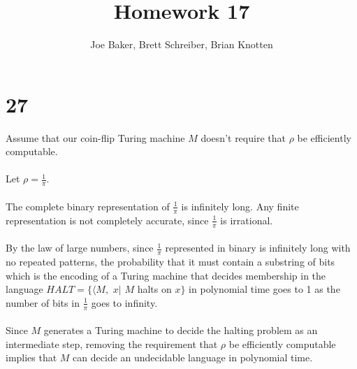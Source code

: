 \documentclass[letterpaper,notitlepage,twoside]{article}
\begin{document}
\title{Homework 17}
\author{Joe Baker, Brett Schreiber, Brian Knotten}
\maketitle

\section*{27}
Assume that our coin-flip Turing machine $M$ doesn't require that $\rho$ be efficiently computable.
\\\\
Let $\rho = \frac{1}{\pi}$.
\\\\
The complete binary representation of $\frac{1}{\pi}$ is infinitely long. Any finite representation is not completely accurate, since $\frac{1}{\pi}$ is irrational.
\\\\
By the law of large numbers, since $\frac{1}{\pi}$ represented in binary is infinitely long with no repeated patterns, the probability that it must contain a substring of bits which is the encoding of a Turing machine that decides membership in the language $HALT=\{\langle M,$ $x|$ $M$ halts on $x \}$ in polynomial time goes to 1 as the number of bits in $\frac{1}{\pi}$ goes to infinity.
\\\\
Since $M$ generates a Turing machine to decide the halting problem as an intermediate step, removing the requirement that $\rho$ be efficiently computable implies that $M$ can decide an undecidable language in polynomial time. 
\end{document}
